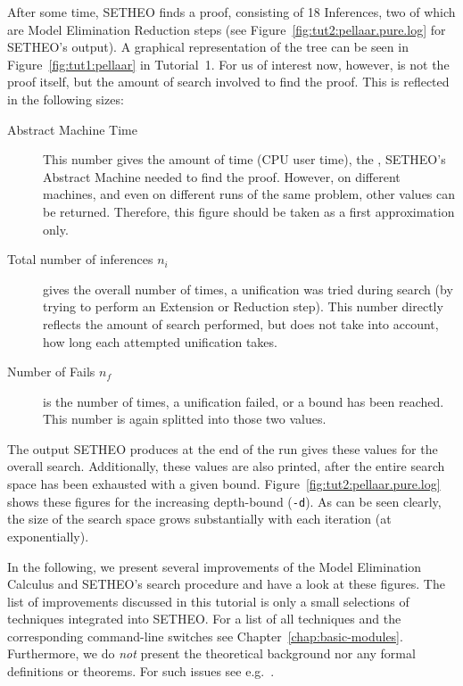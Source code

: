 After some time, SETHEO finds a proof, consisting of 18 Inferences,
two of which are Model Elimination Reduction steps
(see Figure~\ref{fig:tut2:pellaar.pure.log}  for SETHEO's output).
A graphical representation
of the tree can be seen in Figure~\ref{fig:tut1:pellaar} in Tutorial~1.
For us of interest now, however, is not the proof itself, but the amount
of search involved to find the proof.
This is reflected in the following sizes:

\begin{description}
\item[Abstract Machine Time] This number gives the amount of time (CPU user 
time),
the \SAM, SETHEO's Abstract Machine needed to find the proof. 
However, on different machines, and even on different runs of the same
problem, other values can be returned. Therefore, this figure should be
taken as a first approximation only.
\item[Total number of inferences $n_i$] gives the overall number of times,
a unification was tried during search (by trying to perform an
Extension or Reduction step). This number directly reflects the amount
of search performed, but does not take into account, how long each
attempted unification takes.

\item[Number of Fails $n_f$] is the number of times, a unification failed,
or a bound has been reached. This number is again splitted into those
two values.
\end{description}

The output SETHEO produces at the end of the run gives these values
for the overall search. Additionally, these values are also
printed, after the entire search space has been exhausted with a given
bound. Figure~\ref{fig:tut2:pellaar.pure.log} shows these figures
for the increasing depth-bound ({\tt -d}). As can be seen clearly,
the size of the search space grows substantially with each iteration
(at exponentially).

In the following, we present several improvements of the Model
Elimination Calculus and SETHEO's search procedure and have a look
at these figures.
The list of improvements discussed in this tutorial
is only a small selections of techniques integrated into SETHEO.
For a list of all techniques and the corresponding command-line
switches see Chapter~\ref{chap:basic-modules}.
Furthermore, we do {\em not\/} present the theoretical background
nor any formal definitions or theorems. For such issues see
e.g.\ \cite{LSBB89,LMG94,Letzdiss,Mayrdiss}.

